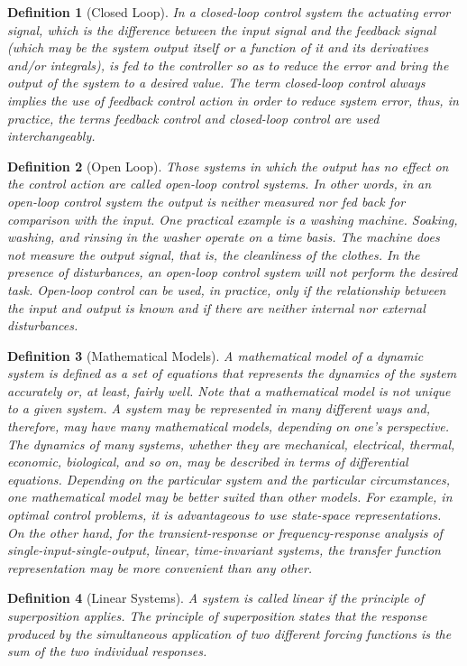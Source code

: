 \documentclass[]{report}
\newtheorem{defi}{Definition}
\begin{document}
\begin{defi}[Closed Loop]
	In a closed-loop control system the actuating error signal, which is the difference between the input signal and the feedback signal (which may be the system output itself or a function of it and its derivatives and/or integrals), is fed to the controller so as to reduce the error and bring the output of the system to a desired value.
	The term closed-loop control always implies the use of feedback control action in order to reduce system error, thus, in practice, the terms feedback control and closed-loop control are used interchangeably. 
\end{defi}
\begin{defi}[Open Loop]
	Those systems in which the output has no effect on the control action are called open-loop control systems. 
	In other words, in an open-loop control system the output is neither measured nor fed back for comparison with the input. 
	One practical example is a washing machine. 
	Soaking, washing, and rinsing in the washer operate on a time basis. 
	The machine does not measure the output signal, that is, the cleanliness of the clothes.
	In the presence of disturbances, an open-loop control system will not perform the desired task. 
	Open-loop control can be used, in practice, only if the relationship between the input and output is known and if there are neither internal nor external disturbances.
\end{defi}
\begin{defi}[Mathematical Models]
	A mathematical model of a dynamic system is defined as a set of equations that represents the dynamics of the system accurately or, at least, fairly well. 
	Note that a mathematical model is not unique to a given system. 
	A system may be represented in many different ways and, therefore, may have many mathematical models, depending on one's perspective.
	The dynamics of many systems, whether they are mechanical, electrical, thermal, economic, biological, and so on, may be described in terms of differential equations.
	Depending on the particular system and the particular circumstances, one mathematical model may be better suited than other models. 
	For example, in optimal control problems, it is advantageous to use state-space representations. 
	On the other hand, for the transient-response or frequency-response analysis of single-input-single-output, linear, time-invariant systems, the transfer function representation may be more convenient than any other. 
\end{defi}
\begin{defi}[Linear Systems]
	A system is called linear if the principle of superposition applies. 
	The principle of superposition states that the response produced by the simultaneous application of two different forcing functions is the sum of the two
	individual responses.
\end{defi}
\end{document}
